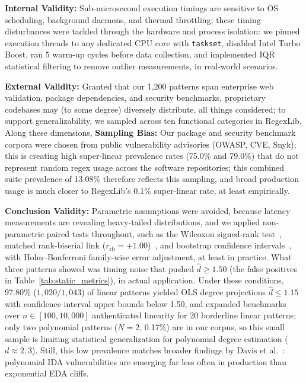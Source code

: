 \documentclass{ieeeaccess}
\begin{document}
\textbf{Internal Validity:} Sub-microsecond execution timings are sensitive to OS scheduling, background daemons, and thermal throttling; these timing disturbances were tackled through the hardware and process isolation: we pinned execution threads to any dedicated CPU core with \texttt{taskset}, disabled Intel Turbo Boost, ran 5 warm-up cycles before data collection, and implemented IQR statistical filtering to remove outlier measurements, in real-world scenarios.

\textbf{External Validity:} Granted that our 1,200 patterns span enterprise web validation, package dependencies, and security benchmarks, proprietary codebases may (to some degree) diversely distribute, all things considered; to support generalizability, we sampled across ten functional categories in RegexLib. Along these dimensions, \textbf{Sampling Bias:} Our package and security benchmark corpora were chosen from public vulnerability advisories (OWASP, CVE, Snyk); this is creating high super-linear prevalence rates (75.0\% and 79.0\%) that do not represent random regex usage across the software repositories; this combined suite prevalence of 13.08\% therefore reflects this sampling, and broad production usage is much closer to RegexLib's 0.1\% super-linear rate, at least empirically.

\textbf{Conclusion Validity:} Parametric assumptions were avoided, because latency measurements are revealing heavy-tailed distributions, and we applied non-parametric paired tests throughout, such as the Wilcoxon signed-rank test~\cite{wilcoxon1945individual}, matched rank-biserial link ($r_{\mathrm{rb}} = +1.00$)~\cite{kerby2014simple}, and bootstrap confidence intervals~\cite{efron1993introduction}, with Holm--Bonferroni family-wise error adjustment, at least in practice. What three patterns showed was timing noise that pushed $\hat{d} \ge 1.50$ (the false positives in Table~\ref{tab:static_metrics}), in actual application. Under these conditions, 97.80\% ($1{,}020/1{,}043$) of linear patterns yielded OLS degree projections $\hat{d} \le 1.15$ with confidence interval upper bounds below 1.50, and expanded benchmarks over $n \in [100, 10{,}000]$ authenticated linearity for 20 borderline linear patterns; only two polynomial patterns ($N=2$, 0.17\%) are in our corpus, so this small sample is limiting statistical generalization for polynomial degree estimation ($d \approx 2, 3$). Still, this low prevalence matches broader findings by Davis et al.~\cite{davis2018ecosystem,davis2021memoization}: polynomial IDA vulnerabilities are emerging far less often in production than exponential EDA cliffs.
\end{document}
